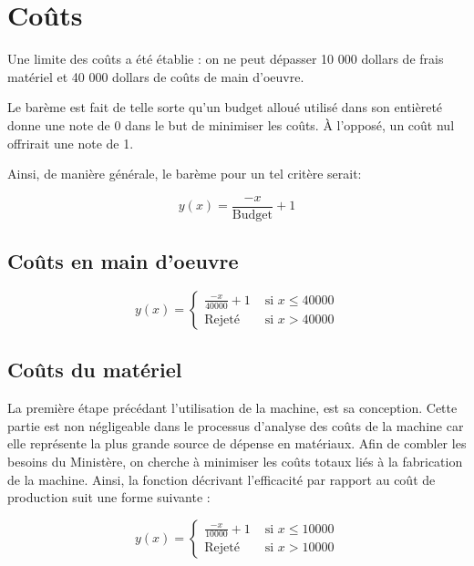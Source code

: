 \section{Coûts}
\label{Coutsgloba}

Une limite des coûts a été établie : on ne peut dépasser 10 000 dollars de frais matériel et 40 000 dollars de coûts de main d'oeuvre. 

Le barème est fait de telle sorte qu'un budget alloué utilisé dans son entièreté donne une note de 0 dans le but de minimiser les coûts. À l'opposé, un coût nul offrirait une note de 1.

Ainsi, de manière générale, le barème pour un tel critère serait:

\begin{equation}
    y(x)=\frac{-x}{\text{Budget}} + 1
\end{equation}

\subsection{Coûts en main d'oeuvre}
\label{cenmaindo}

\begin{equation}
y(x) = \begin{cases}
        \frac{-x}{40000} + 1 & \text{ si } x \leq 40000\\
        \text{Rejeté} & \text{ si } x > 40000
    \end{cases}
    \label{eq:bareme_cout_logiciel}
\end{equation}

\subsection{Coûts du matériel}
\label{ccdpsdsfsd}

La première étape précédant l’utilisation de la machine, est sa conception. Cette partie est non négligeable dans le processus d’analyse des coûts de la machine car elle représente la plus grande source de dépense en matériaux. Afin de combler les besoins du Ministère, on cherche à minimiser les coûts totaux liés à la fabrication de la machine. %
Ainsi, la fonction décrivant l’efficacité par rapport au coût de production suit une forme suivante :

\begin{equation}
y(x) = \begin{cases}
        \frac{-x}{10000} + 1 & \text{ si } x \leq 10000\\
        \text{Rejeté} & \text{ si } x > 10000
    \end{cases}
    \label{eq:bareme_cout_materiel}
\end{equation}

